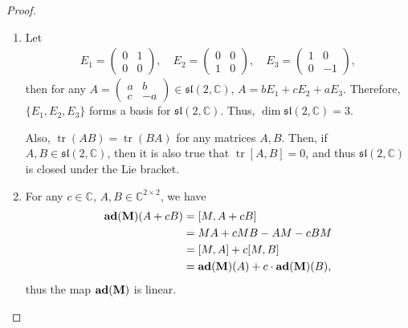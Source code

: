 \documentclass[11pt]{article}
\theoremstyle{definition}
\numberwithin{equation}{subsection}
\begin{document}
\begin{proof}
~\begin{enumerate}[label=(\alph*)]
    \item Let 
    \begin{align*}
        E_1 = \begin{pmatrix} 0 & 1 \\ 0 & 0 \end{pmatrix}, \quad E_2 = \begin{pmatrix} 0 & 0 \\ 1 & 0 \end{pmatrix}, \quad E_3 = \begin{pmatrix} 1 & 0 \\ 0 & -1 \end{pmatrix},
    \end{align*}
    then for any $A = \begin{pmatrix} a & b \\ c & -a \end{pmatrix} \in \mathfrak{sl}(2, \mathbb{C})$, $A = b E_1 + c E_2 + a E_3$. Therefore, $\{E_1, E_2, E_3\}$ forms a basis for $\mathfrak{sl}(2, \mathbb{C})$. Thus, $\dim \mathfrak{sl}(2, \mathbb{C}) = 3$.
    
    Also, $\operatorname{tr}(AB) = \operatorname{tr}(BA)$ for any matrices $A, B$. Then, if $A, B \in \mathfrak{sl}(2, \mathbb{C})$, then it is also true that $\operatorname{tr} [A, B] = 0$, and thus $\mathfrak{sl}(2, \mathbb{C})$ is closed under the Lie bracket.
    
    \item For any $c \in \mathbb{C}$, $A, B \in \mathbb{C}^{2 \times 2}$, we have
    \begin{align*}
        {\bf ad}({\bf M})(A + cB) & = [M, A + cB] \\
        & = MA + cMB - AM - cBM \\
        & = [M, A] + c [M, B] \\
        & = {\bf ad}({\bf M})(A) + c \cdot {\bf ad}({\bf M})(B),
    \end{align*}
    thus the map ${\bf ad}({\bf M})$ is linear. 
    

\end{enumerate}
\end{proof}
\end{document}
